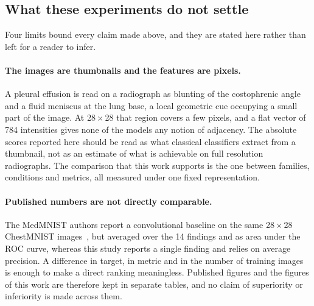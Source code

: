 
\subsection{What these experiments do not settle}
\label{sec:results-limits}

Four limits bound every claim made above, and they are stated here rather than
left for a reader to infer.

\paragraph{The images are thumbnails and the features are pixels.}
A pleural effusion is read on a radiograph as blunting of the costophrenic angle
and a fluid meniscus at the lung base, a local geometric cue occupying a small
part of the image. At \num{28}\,$\times$\,\num{28} that region covers a few
pixels, and a flat vector of \num{784} intensities gives none of the models any
notion of adjacency. The absolute scores reported here should be read as what
classical classifiers extract from a thumbnail, not as an estimate of what is
achievable on full resolution radiographs. The comparison that this work
supports is the one between families, conditions and metrics, all measured under
one fixed representation.

\paragraph{Published numbers are not directly comparable.}
The MedMNIST authors report a convolutional baseline on the same
\num{28}\,$\times$\,\num{28} ChestMNIST images~\cite{yang2023medmnist}, but
averaged over the \num{14} findings and as area under the ROC curve, whereas
this study reports a single finding and relies on average precision. A
difference in target, in metric and in the number of training images is enough
to make a direct ranking meaningless. Published figures and the figures of this
work are therefore kept in separate tables, and no claim of superiority or
inferiority is made across them.

